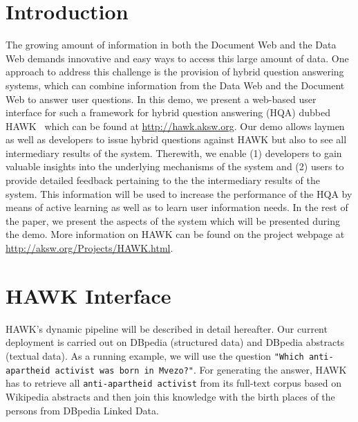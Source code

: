 \documentclass{llncs}
\begin{document}
\section{Introduction}
The growing amount of information in both the Document Web and the Data Web demands innovative and easy ways to access this large amount of data. One approach to address this challenge is the provision of hybrid question answering systems, which can combine information from the Data Web and the Document Web to answer user questions. %
In this demo, we present a web-based user interface for such a framework for hybrid question answering (HQA) dubbed HAWK~\cite{HAWK_2015} which can be found at \url{http://hawk.aksw.org}.
Our demo allows laymen as well as developers to issue hybrid questions against HAWK but also to see all intermediary results of the system. Therewith, we enable (1) developers to gain valuable insights into the underlying mechanisms of the system and (2)  users to provide detailed feedback pertaining to the the intermediary results of the system. This information will be used to increase the performance of the HQA by means of active learning as well as to learn user information needs. 
In the rest of the paper, we present the aspects of the system which will be presented during the demo.  %
More information on HAWK can be found on the project webpage at \url{http://aksw.org/Projects/HAWK.html}.


\section{HAWK Interface}
\label{sec:interaction}

HAWK's dynamic pipeline will be described in detail hereafter. Our current deployment is carried out on DBpedia (structured data) and DBpedia abstracts (textual data).
As a running example, we will use the question \texttt{"Which anti-apartheid activist was born in Mvezo?"}.
For generating the answer, HAWK has to retrieve all \texttt{anti-apartheid activist} from its full-text corpus based on Wikipedia abstracts and then join this knowledge with the birth places of the persons from DBpedia Linked Data.
\end{document}
